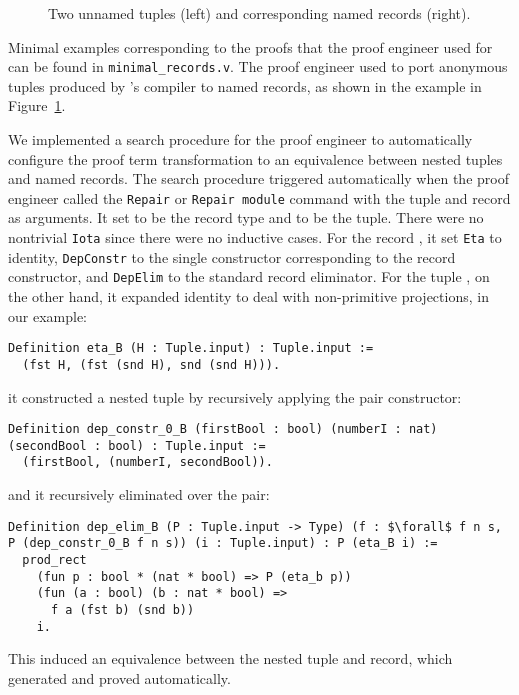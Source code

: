 \begin{figure}
\begin{minipage}{0.25\textwidth}
   
\end{minipage}
\hfill
\begin{minipage}{0.74\textwidth}
   
\end{minipage}
\caption{Two unnamed tuples (left) and corresponding named records (right).}
\label{fig:records}
\end{figure}

Minimal examples corresponding to the proofs that the proof engineer used \toolname for
can be found in \lstinline{minimal_records.v}.
The proof engineer used \toolname to port anonymous tuples produced by \company's compiler
to named records, as shown in the example in Figure~\ref{fig:records}.

We implemented a search procedure for the proof engineer to automatically configure the proof term transformation to an equivalence
between nested tuples and named records.
The search procedure triggered automatically when the proof engineer called the \lstinline{Repair} or \lstinline{Repair module} command
with the tuple and record as arguments.
It set \A to be the record type and \B to be the tuple.
There were no nontrivial \lstinline{Iota} since there were no inductive cases.
For the record \A, it set \lstinline{Eta} to identity, \lstinline{DepConstr} to the single
constructor corresponding to the record constructor, and \lstinline{DepElim} to the standard record eliminator.
For the tuple \B, on the other hand, it expanded identity to deal with non-primitive projections,
in our example:
\begin{lstlisting}
Definition eta_B (H : Tuple.input) : Tuple.input :=
  (fst H, (fst (snd H), snd (snd H))).
\end{lstlisting}
it constructed a nested tuple by recursively applying the pair constructor:

\begin{lstlisting}
Definition dep_constr_0_B (firstBool : bool) (numberI : nat) (secondBool : bool) : Tuple.input :=
  (firstBool, (numberI, secondBool)).
\end{lstlisting}
and it recursively eliminated over the pair:

\begin{lstlisting}
Definition dep_elim_B (P : Tuple.input -> Type) (f : $\forall$ f n s, P (dep_constr_0_B f n s)) (i : Tuple.input) : P (eta_B i) :=
  prod_rect
    (fun p : bool * (nat * bool) => P (eta_b p))
    (fun (a : bool) (b : nat * bool) =>
      f a (fst b) (snd b))
    i.
\end{lstlisting}
This induced an equivalence between the nested tuple and record,
which \toolname generated and proved automatically.

